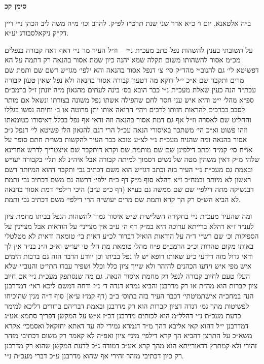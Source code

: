 \documentclass[12pt, openany]{book}
\newcommand{\chapname}{}
\newcommand{\newchap}[1]{
	\addcontentsline{toc}{chapter}{#1}
	\renewcommand{\chapname}{#1}
		\begin{center}
			\textbf{%
\fontsize{16pt}{16pt}\selectfont
				#1}
		\end{center}
}
\begin{document}
\newchap{סימן קכ}
\begin{multicols}{2}
ב״ה אלטאנא, יום ו׳ כ״א אדר שני שנת תרט״ז לפ״ק. להרב וכו׳ מ״ה משה ליב הכהן נ״י דיין דק״ק ניקאלסבורג יע״א.\\\vspace{0pt}

על תשובתי בענין להשהות נפל כתב מעכ״ת נ״י – וז״ל העיר מר נ״י דאף דאח קבורה בנפלים מכ״מ אסור להשהותו משום תקלה שמא יהנה כיון שמת אסור בהנאה רק דתמה על הא דפשיטא לי׳ גם להנוב״י מהד״ק סי׳ צ׳ דנפל אסור בהנאה והא ילפי׳ מגז״ש דשם שם ותמת שם מרים ותקבר שם א״כ י״ל דוקא מה דטעון קבורה אסור בהנאה ולא נפל שאין טעון קבורה עכת״ד הנה כעין שאלת מעכ״ת נ״י כבר הובא בס׳ בינה לעתים מהגאון מ״ה יונתן ז״ל ברמב״ם ספ״א מהל׳ י״ט והיא איש עני חסר לחם שהפילה אשתו נפל משונה בצורתו ונשאל אם מותר לסבב בכרכים להראות חזותו לרבים ויהי׳ הרואה אותו יתן פרוטה או ב׳ וחיתה נפשו בגללו והחליט שם לאסרה וז״ל אף גם דמת אסור בהנאה וזה ודאי אף נפל בכלל דאיסורו כטומאתו וזהו פשוט וא״כ הי׳ משתכר באיסורי הנאה עכ״ל הרי דגם להגאון הלז פשיטא לי׳ דנפל ג״כ אסור בהנאה ומה שהניח מעכ״ת נ״י לצ״ע טובא כבר העיר להקשות בשו״ת חתם סופר על או״ח סי׳ קמ״ד וכתב דילפינן שם שם מותמת שם וקרא דותקבר שם איצטריך לדרש אחרינא שלהי מ״ק דאין משהין מטה של נשים דסמוך למיתה קבורה אבל איה״נ לא תלי׳ בקבורה יעו״ש ובאמת גם מעכ״ת נ״י העיר בזה וכתב דגז״ש הוא משם דכתיב גבי ותקבר דהוא המיותר דשם ראשון לא מיותר ובמח״כ ז״א דהלא סוף מ״ק דף כ״ח ילפי׳ דרשה גם משם דכתיב גבי ותמת דבנשיקה מתה דילפי׳ שם שם ממשה גם בע״א (דף כ״ט ע״ב) היכי דילפי׳ דמת אסור בהנאה לא הביא הש״ס רק הך קרא ותמת שם מרים יעוש״ה הרי דילפי׳ משם דכתיב גבי ותמת.\\\vspace{0pt}

ומה שהעיר מעכ״ת נ״י בחקירה השלישית שיש איסור גמור להשהות הנפל בביתו מחמת ציון לענ״ד ז״א דהלא ברייתא ערוכה היא במ״ק דף ה׳ ע״ב אין מצייני׳ על הודאות אבל מציינין על הספיקות וכ׳ שם רש״י ד״ה על הודאות הואיל דברור לכ״ע דאית בי׳ טומאה ודאית לא מטלטלי באותו מקום טהרות וכ״כ הרמב״ם פ״ח מהל׳ טומאת מת הל׳ ט׳ יעו״ש וא״כ ה״נ בנ״ד אין לך ודאי גדול מזה דידעי כ״ע שאותו רופא יש לו נפל בביתו וכן יוודע הדבר הזה גם ברבות הימים איש מפי איש וידעו הכהנים להזהר ולא שייך ציון כלל וכלל ושפיר עבדו התי״ט והנוב״י שלא העלו טעם לחיוב קבורה לנפל רק מחמת איסור הנאה. גם מה שנסתפק מעכ״ת נ״י אם חיוב ציון קברות הוא מה״ת או רק מדרבנן והביא גמרא דנדה ד׳ נ״ז ודחה דמשם ליכא ראי׳ דמדרבנן הנה במחכ״ה אישתמיטתי׳ דכבר העיר בזה בתוס׳ ב״ב (דף קמ״ז ע״א) סוף ד״ה מנין שהוכיחו לפשיטות מהך גמ׳ דנדה דציון קברות הוא רק מדרבנן ובאמת דבריהם ברורים דליכא למימר כדעת מעכ״ת נ״י דהלל״מ הוא לכותים מדרבנן דכ״ז א״ש על המקשן דפריך סתמא אע״ג דמדרבנן י״ל דהוא קאי אליבא דהך מ״ד דגמרא גמירי לה עד דאתא יחזקאל ואסמכי׳ אקרא משא״כ על התרצן דהביא הך קרא דילפי׳ מיני׳ ציון ואפ״ה לא קאמר רק משום דכתיבי מזהר זהירי ולא קמתרץ דדאורייתא הוא מהך קרא אע״כ דמודה ג״כ לדעת המקשן שהוא רק מדרבנן רק כיון דכתיבי מזהר זהירי אף שהוא מדרבנן ע״כ דברי מעכ״ת נ״י.\\\vspace{0pt}


\end{multicols}
\end{document}
